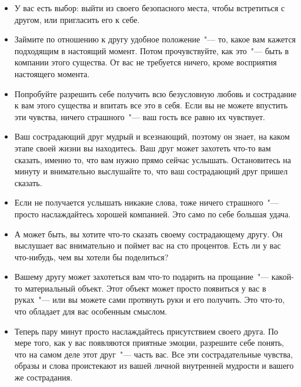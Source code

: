 \begin{itemize}
	\item У вас есть выбор: выйти из своего безопасного места, чтобы встретиться с другом, или пригласить его к себе.
	
	\item Займите по отношению к другу удобное положение~"--- то, какое вам кажется подходящим в настоящий момент. Потом прочувствуйте, как это~"--- быть в компании этого существа. От вас не требуется ничего, кроме восприятия настоящего момента.
	
	\item Попробуйте разрешить себе получить всю безусловную любовь и сострадание к вам этого существа и впитать все это в себя. Если вы не можете впустить эти чувства, ничего страшного~"--- ваш гость все равно их чувствует.
\end{itemize}

\vspace{3ex}

\begin{itemize}
	\item Ваш сострадающий друг мудрый и всезнающий, поэтому он знает, на каком этапе своей жизни вы находитесь. Ваш друг может захотеть что-то вам сказать, именно то, что вам нужно прямо сейчас услышать. Остановитесь на минуту и внимательно выслушайте то, что ваш сострадающий друг пришел сказать.
	
	\item Если не получается услышать никакие слова, тоже ничего страшного~"--- просто наслаждайтесь хорошей компанией. Это само по себе большая удача.
	
	\item А может быть, вы хотите что-то сказать своему сострадающему другу. Он выслушает вас внимательно и поймет вас на сто процентов. Есть ли у вас что-нибудь, чем вы хотели бы поделиться?
	
	\item Вашему другу может захотеться вам что-то подарить на прощание~"--- какой-то материальный объект. Этот объект может просто появиться у вас в руках~"--- или вы можете сами протянуть руки и его получить. Это что-то, что обладает для вас особенным смыслом.
	
	\item Теперь пару минут просто наслаждайтесь присутствием своего друга. По мере того, как у вас появляются приятные эмоции, разрешите себе понять, что на самом деле этот друг~"--- часть вас. Все эти сострадательные чувства, образы и слова проистекают из вашей личной внутренней мудрости и вашего же сострадания.
\end{itemize}

